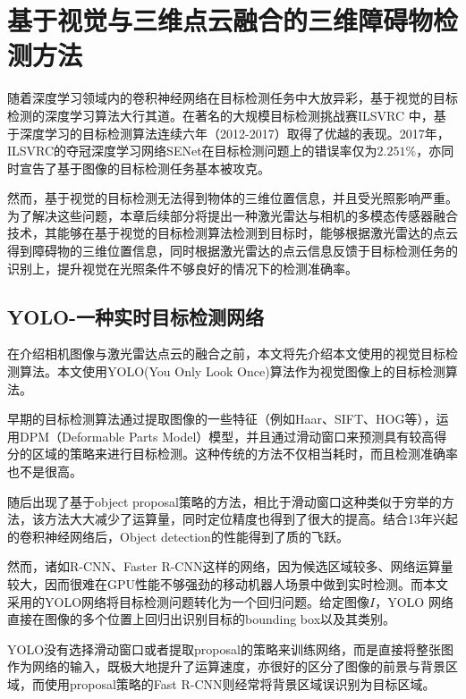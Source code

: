 
\chapter{基于视觉与三维点云融合的三维障碍物检测方法}

随着深度学习领域内的卷积神经网络在目标检测任务中大放异彩，基于视觉的目标检测的深度学习算法大行其道。在著名的大规模目标检测挑战赛ILSVRC 中，基于深度学习的目标检测算法连续六年（2012-2017）取得了优越的表现。2017年，ILSVRC的夺冠深度学习网络SENet在目标检测问题上的错误率仅为$2.251 \%$，亦同时宣告了基于图像的目标检测任务基本被攻克。

然而，基于视觉的目标检测无法得到物体的三维位置信息，并且受光照影响严重。为了解决这些问题，本章后续部分将提出一种激光雷达与相机的多模态传感器融合技术，其能够在基于视觉的目标检测算法检测到目标时，能够根据激光雷达的点云得到障碍物的三维位置信息，同时根据激光雷达的点云信息反馈于目标检测任务的识别上，提升视觉在光照条件不够良好的情况下的检测准确率。

\section{YOLO-一种实时目标检测网络}

在介绍相机图像与激光雷达点云的融合之前，本文将先介绍本文使用的视觉目标检测算法。本文使用YOLO(You Only Look Once)算法作为视觉图像上的目标检测算法。


早期的目标检测算法通过提取图像的一些特征（例如Haar、SIFT、HOG等），运用DPM（Deformable Parts Model）模型，并且通过滑动窗口来预测具有较高得分的区域的策略来进行目标检测。这种传统的方法不仅相当耗时，而且检测准确率也不是很高。

随后出现了基于object proposal策略的方法，相比于滑动窗口这种类似于穷举的方法，该方法大大减少了运算量，同时定位精度也得到了很大的提高。结合13年兴起的卷积神经网络后，Object detection的性能得到了质的飞跃。

然而，诸如R-CNN、Faster R-CNN这样的网络，因为候选区域较多、网络运算量较大，因而很难在GPU性能不够强劲的移动机器人场景中做到实时检测。而本文采用的YOLO网络将目标检测问题转化为一个回归问题。给定图像$I$，YOLO 网络直接在图像的多个位置上回归出识别目标的bounding box以及其类别。

YOLO没有选择滑动窗口或者提取proposal的策略来训练网络，而是直接将整张图作为网络的输入，既极大地提升了运算速度，亦很好的区分了图像的前景与背景区域，而使用proposal策略的Fast R-CNN则经常将背景区域误识别为目标区域。

